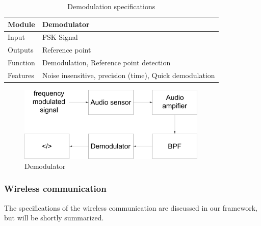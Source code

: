 \documentclass[10pt,a4paper]{article}
\begin{document}
\begin{table}[H]
\centering
\caption{Demodulation specifications}
\label{demosensor}
\begin{tabular}{|p{}|p{}|}
\hline
Module   & Demodulator                                   \\ \hline
Input    & FSK Signal                                             \\ \hline
Outputs  & Reference point                                         \\ \hline
Function & Demodulation, Reference point detection \\ \hline
Features & Noise insensitive, precision (time), Quick demodulation  \\ \hline
\end{tabular}
\end{table}

\begin{figure}[H]
  \centering
      \includegraphics[width=0.8\textwidth]{demodulator.pdf}
  \caption{Demodulator}
  \label{demodulator}
\end{figure}

\subsubsection{Wireless communication} 

The specifications of the wireless communication are  discussed in our framework, but will be shortly summarized. 
\end{document}
